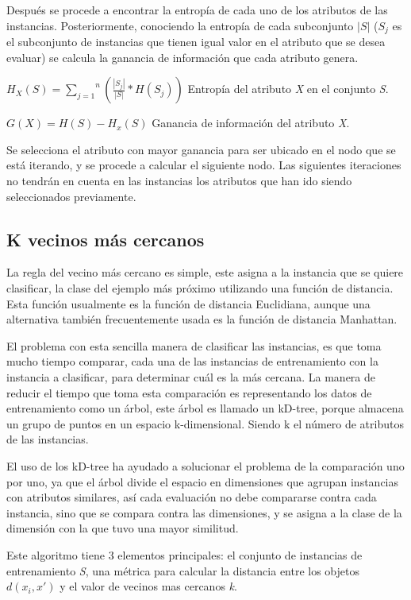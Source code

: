 Después se procede a encontrar la entropía de cada uno de los atributos de las instancias. Posteriormente, conociendo la entropía de cada subconjunto $\left|S\right|$ ($S_{j}$ es el subconjunto de instancias que
tienen igual valor en el atributo que se desea evaluar) se calcula
la ganancia de información que cada atributo genera.
\begin{center}
$H_{X}(S)=\overset{n}{\underset{j=1}{\sum}}(\frac{|S_{j}|}{|S|}*H(S_{j}))$ Entropía del atributo \emph{X} en el conjunto \emph{S}.

$G(X)=H(S)-H_{x}(S)$ Ganancia de información del atributo \emph{X}.
\end{center}

Se selecciona el atributo con mayor ganancia para ser ubicado en el
nodo que se está iterando, y se procede a calcular el siguiente nodo.
Las siguientes iteraciones no tendrán en cuenta en las instancias
los atributos que han ido siendo seleccionados previamente\cite{key-290}.
\subsection{K vecinos más cercanos}
La regla del vecino más cercano es simple, este asigna a la instancia
que se quiere clasificar, la clase del ejemplo más próximo utilizando
una función de distancia. Esta función usualmente es la función de
distancia Euclidiana, aunque una alternativa también frecuentemente
usada es la función de distancia Manhattan.

El problema con esta sencilla manera de clasificar las instancias,
es que toma mucho tiempo comparar, cada una de las instancias de entrenamiento
con la instancia a clasificar, para determinar cuál es la más cercana.
La manera de reducir el tiempo que toma esta comparación es representando
los datos de entrenamiento como un árbol, este árbol es llamado un
kD-tree\cite{key-220}, porque almacena un grupo de
puntos en un espacio k-dimensional. Siendo k el número de atributos
de las instancias.

El uso de los kD-tree ha ayudado a solucionar el problema de la comparación
uno por uno, ya que el árbol divide el espacio en dimensiones que
agrupan instancias con atributos similares, así cada evaluación no
debe compararse contra cada instancia, sino que se compara contra
las dimensiones, y se asigna a la clase de la dimensión con la que
tuvo una mayor similitud\cite{key-210}.

Este algoritmo tiene 3 elementos principales: el conjunto de instancias
de entrenamiento \emph{S}, una métrica para calcular la distancia
entre los objetos $d(x_{i},x')$ y el valor de vecinos mas
cercanos \emph{k}. 

